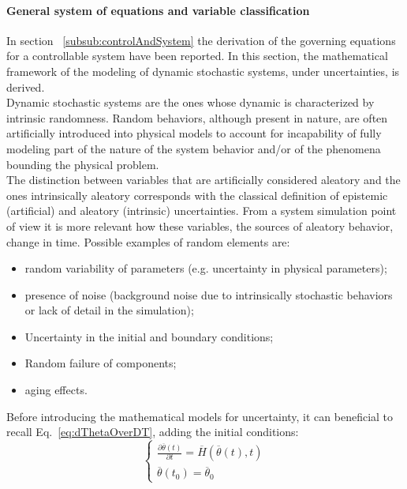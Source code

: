 \paragraph{General system of equations and variable classification}
In section ~\ref{subsub:controlAndSystem} the derivation of the governing equations for a controllable system
have been reported. In this section, the mathematical framework of the modeling of dynamic stochastic systems,
under uncertainties,  is derived. 
\\ Dynamic stochastic systems are the ones whose dynamic is characterized by intrinsic randomness. Random 
behaviors, although present in nature, are often artificially introduced into physical models to account for 
incapability of fully modeling part of the nature of the system behavior and/or of the phenomena bounding the
physical problem.
\\The distinction between variables that are artificially considered aleatory and the ones intrinsically aleatory 
corresponds with the classical definition of epistemic (artificial) and aleatory (intrinsic) uncertainties. From a 
system simulation point of view it is more relevant how these variables, the sources of aleatory behavior, change 
in time.
Possible examples of random elements are:
\begin{itemize}
 \item random variability of parameters (e.g. uncertainty in physical parameters);
 \item presence of noise (background noise due to intrinsically stochastic behaviors or lack of detail in the 
 simulation);
 \item Uncertainty in the initial and boundary conditions;
 \item Random failure of components;
 \item aging effects.
\end{itemize}
Before introducing the mathematical models for uncertainty,  it can beneficial to recall 
Eq.~\ref{eq:dThetaOverDT}, adding the initial conditions:
\begin{equation}
\label{eq:dThetaOverDTWithBoundary}
\left\{\begin{matrix}
\frac{\partial  \overline{\theta}\left ( t \right )}{\partial t}=\overline{H}\left (  \overline{\theta}\left ( t \right ),t \right ) \\ 
 \overline{\theta}\left ( t_{0} \right ) = \overline{\theta}_{0}
\end{matrix}\right.
\end{equation}
